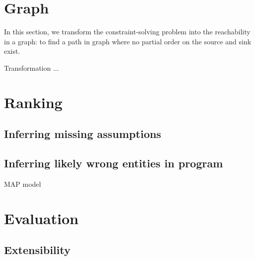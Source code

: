 \section{Graph} 
\label{sec:graph}

In this section, we transform the constraint-solving problem into the
reachability in a graph: to find a path in graph where no partial order on the
source and sink exist. 

Transformation ... 

% 
% 
% 
% 
% 
% 
\section{Ranking}
\label{sec:ranking}

\subsection{Inferring missing assumptions}
\label{sec:assumptions}

\subsection{Inferring likely wrong entities in program}

MAP model

\section{Evaluation}
\label{sec:evaluation}

\subsection{Extensibility}

